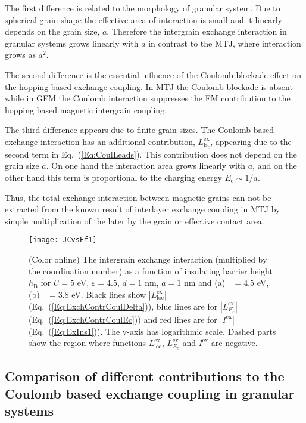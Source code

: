 \documentclass[aps,prb,amsmath,amssymb,twocolumn,superscriptaddress,showpacs,floatfix]{revtex4-1}
\DeclareMathOperator{\Ji}{\mathit J_{\mathrm{sd}}}
\begin{document}
The first difference is related to the morphology of granular system.
Due to spherical grain shape the effective area of interaction
is small and it linearly depends on the grain size, $a$.
Therefore the intergrain exchange interaction in granular systems
grows linearly with $a$ in contrast to the MTJ, where interaction grows as $a^2$.

The second difference is the essential influence
of the Coulomb blockade effect on the hopping based exchange coupling.
In MTJ the Coulomb blockade is absent while in GFM the Coulomb interaction
suppresses the FM contribution to the hopping based magnetic intergrain coupling.

The third difference appears due to finite grain sizes.
The Coulomb based exchange interaction has an additional
contribution, $L^\mathrm{ex}_\mathrm{E_\mathrm c}$, appearing due to the
second term in Eq.~(\ref{Eq:CoulLeads}). This contribution does not
depend on the grain size $a$. On one hand the interaction area grows
linearly with $a$, and on the other hand this term is proportional to the charging energy $E_\mathrm c\sim 1/a$.

Thus, the total exchange interaction between magnetic grains
can not be extracted from the known result of interlayer exchange
coupling in MTJ by simple multiplication of the later by the grain or effective contact area.
\begin{figure}
\texttt{[image: JCvsEf1]}
\caption{(Color online) The intergrain exchange interaction (multiplied by the coordination number) as a function
of insulating barrier height $h_\mathrm B$ for $U=5$ eV, $\varepsilon=4.5$, $d=1$ nm, $a=1$ nm and (a) $\Ji=4.5$ eV, (b) $\Ji=3.8$ eV.
Black lines show $|L^\mathrm{ex}_\mathrm{loc}|$ (Eq.~(\ref{Eq:ExchContrCoulDelta})),
blue lines are for $|L^\mathrm{ex}_{E_\mathrm c}|$ (Eq.~(\ref{Eq:ExchContrCoulEc}))
and red lines are for $|I^\mathrm{ex}|$ (Eq.~(\ref{Eq:ExIns1})).
The y-axis has logarithmic scale. Dashed parts show the region where functions
$L^\mathrm{ex}_\mathrm{loc}$, $L^\mathrm{ex}_{E_\mathrm c}$ and $I^\mathrm{ex}$ are negative.} \label{Fig:JCvsEf1}
\end{figure}



\subsection{Comparison of different contributions to the Coulomb based exchange coupling in granular systems}
\end{document}
